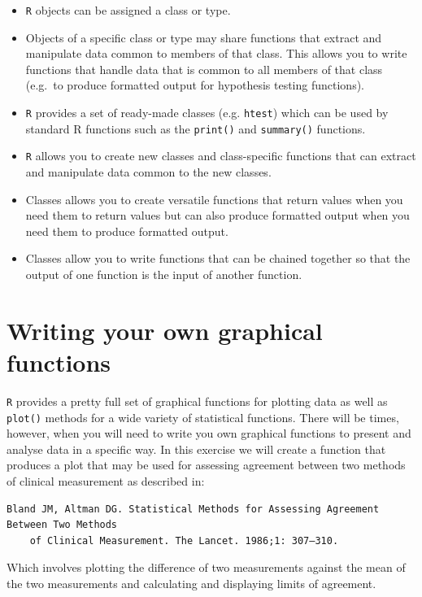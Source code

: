 \documentclass[12pt,a4paper]{book}
\theoremstyle{definition}
\theoremstyle{definition}
\theoremstyle{definition}
\theoremstyle{remark}
\begin{document}
\begin{itemize}
\item
  \texttt{R} objects can be assigned a class or type.
\item
  Objects of a specific class or type may share functions that extract
  and manipulate data common to members of that class. This allows you
  to write functions that handle data that is common to all members of
  that class (e.g.~to produce formatted output for hypothesis testing
  functions).
\item
  \texttt{R} provides a set of ready-made classes (e.g. \texttt{htest})
  which can be used by standard R functions such as the \texttt{print()}
  and \texttt{summary()} functions.
\item
  \texttt{R} allows you to create new classes and class-specific
  functions that can extract and manipulate data common to the new
  classes.
\item
  Classes allows you to create versatile functions that return values
  when you need them to return values but can also produce formatted
  output when you need them to produce formatted output.
\item
  Classes allow you to write functions that can be chained together so
  that the output of one function is the input of another function.
\end{itemize}

\hypertarget{exercise7}{%
\chapter{Writing your own graphical functions}\label{exercise7}}

\texttt{R} provides a pretty full set of graphical functions for
plotting data as well as \texttt{plot()} methods for a wide variety of
statistical functions. There will be times, however, when you will need
to write you own graphical functions to present and analyse data in a
specific way. In this exercise we will create a function that produces a
plot that may be used for assessing agreement between two methods of
clinical measurement as described in:

\begin{verbatim}
Bland JM, Altman DG. Statistical Methods for Assessing Agreement Between Two Methods 
    of Clinical Measurement. The Lancet. 1986;1: 307–310. 
\end{verbatim}

Which involves plotting the difference of two measurements against the
mean of the two measurements and calculating and displaying limits of
agreement.
\end{document}
